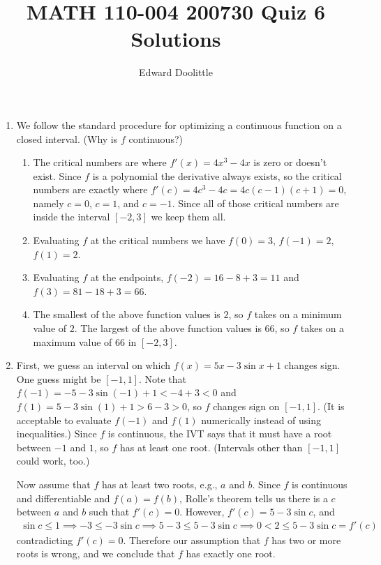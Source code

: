 \documentclass[12pt]{article}
\title{MATH 110-004 200730 Quiz 6 Solutions}
\author{Edward Doolittle}
\begin{document}
\maketitle

\begin{enumerate}
\item We follow the standard procedure for optimizing a continuous function
  on a closed interval.  (Why is $f$ continuous?)
  \begin{enumerate}
  \item The critical numbers are where $f'(x)=4x^3-4x$ is zero or doesn't
    exist.  Since $f$ is a polynomial the derivative always exists, so the
    critical numbers are exactly where $f'(c)=4c^3-4c=4c(c-1)(c+1)=0$,
    namely $c=0$, $c=1$, and $c=-1$.  Since all of those critical numbers
    are inside the interval $[-2,3]$ we keep them all.
  \item Evaluating $f$ at the critical numbers we have
    $f(0)=3$, $f(-1)=2$, $f(1)=2$.
  \item Evaluating $f$ at the endpoints, $f(-2)=16-8+3=11$ and $f(3)=81-18+3
    = 66$.
  \item The smallest of the above function values is $2$, so $f$ takes on a
    minimum value of $2$.  The largest of the above function values is
    $66$, so $f$ takes on a maximum value of $66$ in $[-2,3]$.
  \end{enumerate}
\item First, we guess an interval on which $f(x)=5x-3\sin x+1$ changes sign.
  One guess might be $[-1,1]$.  Note that $f(-1)=-5-3\sin(-1)+1<-4+3<0$
  and $f(1)=5-3\sin(1)+1>6-3>0$, so $f$ changes sign on $[-1,1]$.  (It is
  acceptable to evaluate $f(-1)$ and $f(1)$ numerically instead of using
  inequalities.)  Since $f$ is continuous, the IVT says that it must have
  a root between $-1$ and $1$, so $f$ has at least one root.  (Intervals
  other than $[-1,1]$ could work, too.)

  Now assume that $f$ has at least two roots, e.g., $a$ and $b$.
  Since $f$ is continuous and differentiable and $f(a)=f(b)$, Rolle's 
  theorem tells us there is a $c$ between $a$ and $b$ such that $f'(c)=0$.
  However, $f'(c)=5-3\sin c$, and 
  \begin{align*}
    \sin c \le 1 \implies -3 \le -3\sin c \implies 5-3 \le 5-3\sin c
    \implies 0<2\le 5-3\sin c = f'(c)
  \end{align*}
  contradicting $f'(c)=0$.  Therefore our assumption that $f$ has two or
  more roots is wrong, and we conclude that $f$ has exactly one root.
\end{enumerate}
\end{document}
